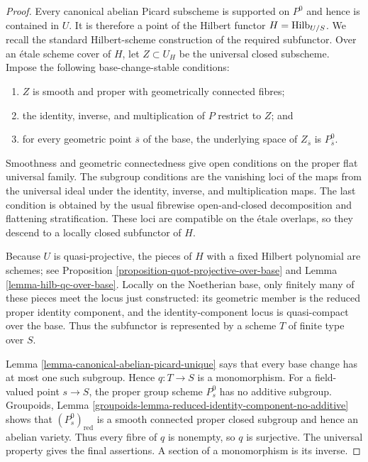 \begin{proof}
Every canonical abelian Picard subscheme is supported on $P^0$ and hence is
contained in $U$. It is therefore a point of the Hilbert functor
$H = \mathrm{Hilb}_{U/S}$. We recall the standard Hilbert-scheme construction
of the required subfunctor. Over an \'etale scheme cover of $H$, let
$Z \subset U_H$ be the universal closed subscheme. Impose the following
base-change-stable conditions:
\begin{enumerate}
\item $Z$ is smooth and proper with geometrically connected fibres;
\item the identity, inverse, and multiplication of $P$ restrict to $Z$; and
\item for every geometric point $\overline{s}$ of the base, the underlying
space of $Z_{\overline{s}}$ is $P^0_{\overline{s}}$.
\end{enumerate}
Smoothness and geometric connectedness give open conditions on the proper
flat universal family. The subgroup conditions are the vanishing loci of the
maps from the universal ideal under the identity, inverse, and multiplication
maps. The last condition is obtained by the usual fibrewise open-and-closed
decomposition and flattening stratification. These loci are compatible on the
\'etale overlaps, so they descend to a locally closed subfunctor of $H$.

Because $U$ is quasi-projective, the pieces of $H$ with a fixed Hilbert
polynomial are schemes; see Proposition
\ref{proposition-quot-projective-over-base} and
Lemma \ref{lemma-hilb-qc-over-base}. Locally on the Noetherian base, only
finitely many of these pieces meet the locus just constructed: its geometric
member is the reduced proper identity component, and the identity-component
locus is quasi-compact over the base. Thus the subfunctor is represented by a
scheme $T$ of finite type over $S$.

Lemma \ref{lemma-canonical-abelian-picard-unique} says that every base change
has at most one such subgroup. Hence $q : T \to S$ is a monomorphism. For a
field-valued point $s \to S$, the proper group scheme $P_s^0$ has no additive
subgroup. Groupoids, Lemma
\ref{groupoids-lemma-reduced-identity-component-no-additive} shows that
$(P_s^0)_{\mathrm{red}}$ is a smooth connected proper closed subgroup and
hence an abelian variety. Thus every fibre of $q$ is nonempty, so $q$ is
surjective. The universal property gives the final assertions. A section of
a monomorphism is its inverse.
\end{proof}

